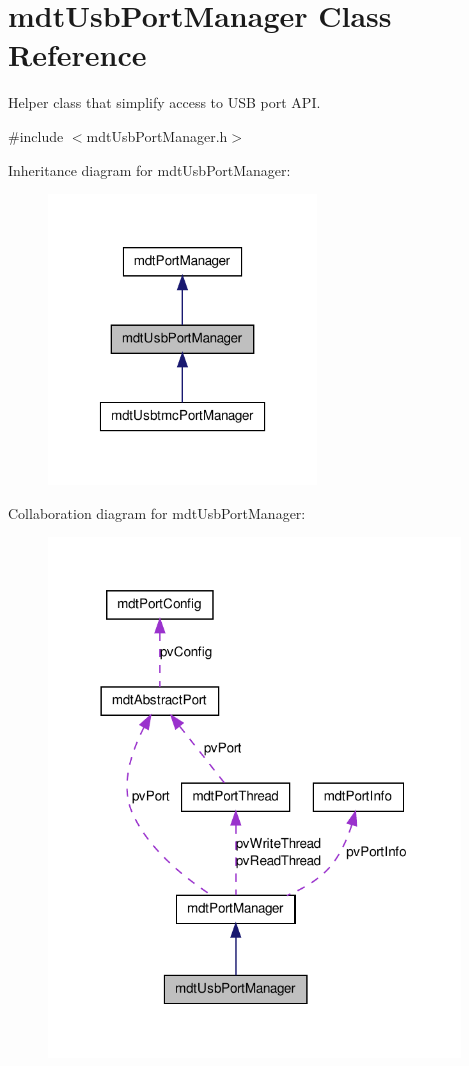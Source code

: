 \hypertarget{classmdt_usb_port_manager}{
\section{mdtUsbPortManager Class Reference}
\label{classmdt_usb_port_manager}
}


Helper class that simplify access to USB port API.  




{\ttfamily \#include $<$mdtUsbPortManager.h$>$}



Inheritance diagram for mdtUsbPortManager:\nopagebreak
\begin{figure}[H]
\begin{center}
\leavevmode
\includegraphics[width=202pt]{classmdt_usb_port_manager__inherit__graph}
\end{center}
\end{figure}


Collaboration diagram for mdtUsbPortManager:
\nopagebreak
\begin{figure}[H]
\begin{center}
\leavevmode
\includegraphics[width=310pt]{classmdt_usb_port_manager__coll__graph}
\end{center}
\end{figure}
